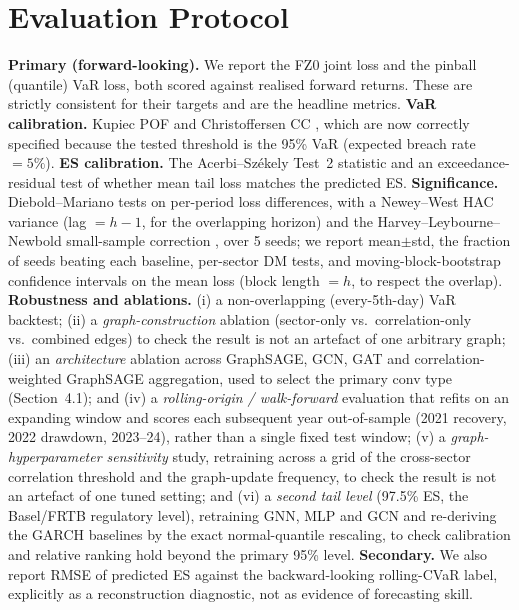 \documentclass{llncs}
\newcommand{\nSeeds}{5}
\begin{document}
\section{Evaluation Protocol}
\textbf{Primary (forward-looking).} We report the FZ0 joint loss and the pinball
(quantile) VaR loss, both scored against realised forward returns. These are
strictly consistent for their targets and are the headline metrics.
\textbf{VaR calibration.} Kupiec POF \citep{kupiec1995} and Christoffersen CC
\citep{christoffersen1998}, which are now correctly specified because the tested
threshold is the 95\% VaR (expected breach rate $=5\%$).
\textbf{ES calibration.} The Acerbi--Sz\'ekely Test~2 statistic
\citep{acerbi2014} and an exceedance-residual test of whether mean tail loss
matches the predicted ES. \textbf{Significance.} Diebold--Mariano tests
\citep{diebold1995} on per-period loss differences, with a Newey--West HAC
variance \citep{newey1987} (lag $=h-1$, for the overlapping horizon) and the
Harvey--Leybourne--Newbold small-sample correction \citep{harvey1997}, over
\nSeeds{} seeds; we report mean$\pm$std, the fraction of seeds beating each
baseline, per-sector DM tests, and moving-block-bootstrap confidence intervals
on the mean loss (block length $=h$, to respect the overlap).
\textbf{Robustness and ablations.} (i) a non-overlapping (every-5th-day) VaR
backtest; (ii) a \emph{graph-construction} ablation (sector-only vs.\
correlation-only vs.\ combined edges) to check the result is not an artefact of
one arbitrary graph; (iii) an \emph{architecture} ablation across GraphSAGE,
GCN, GAT and correlation-weighted GraphSAGE aggregation, used to select the
primary conv type (Section~4.1); and (iv) a
\emph{rolling-origin / walk-forward} evaluation that refits on an expanding
window and scores each subsequent year out-of-sample (2021 recovery, 2022
drawdown, 2023--24), rather than a single fixed test window; (v) a
\emph{graph-hyperparameter sensitivity} study, retraining across a grid of the
cross-sector correlation threshold and the graph-update frequency, to check the
result is not an artefact of one tuned setting; and (vi) a \emph{second tail
level} (97.5\% ES, the Basel/FRTB regulatory level), retraining GNN, MLP and
GCN and re-deriving the GARCH baselines by the exact normal-quantile rescaling,
to check calibration and relative ranking hold beyond the primary 95\% level.
\textbf{Secondary.} We also report RMSE of predicted ES against the
backward-looking rolling-CVaR label, explicitly as a reconstruction diagnostic,
not as evidence of forecasting skill.
\end{document}

